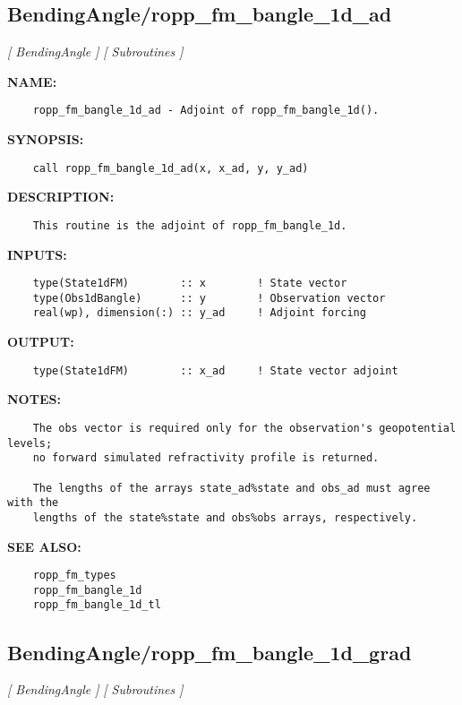 \subsection{BendingAngle/ropp\_fm\_bangle\_1d\_ad}
\textsl{[ BendingAngle ]}
\textsl{[ Subroutines ]}

\label{ch:robo4}
\label{ch:BendingAngle_ropp_fm_bangle_1d_ad}
\textbf{NAME:}\hspace{0.08in}\begin{Verbatim}
    ropp_fm_bangle_1d_ad - Adjoint of ropp_fm_bangle_1d().
\end{Verbatim}
\textbf{SYNOPSIS:}\hspace{0.08in}\begin{Verbatim}
    call ropp_fm_bangle_1d_ad(x, x_ad, y, y_ad)
\end{Verbatim}
\textbf{DESCRIPTION:}\hspace{0.08in}\begin{Verbatim}
    This routine is the adjoint of ropp_fm_bangle_1d.
\end{Verbatim}
\textbf{INPUTS:}\hspace{0.08in}\begin{Verbatim}
    type(State1dFM)        :: x        ! State vector
    type(Obs1dBangle)      :: y        ! Observation vector
    real(wp), dimension(:) :: y_ad     ! Adjoint forcing
\end{Verbatim}
\textbf{OUTPUT:}\hspace{0.08in}\begin{Verbatim}
    type(State1dFM)        :: x_ad     ! State vector adjoint
\end{Verbatim}
\textbf{NOTES:}\hspace{0.08in}\begin{Verbatim}
    The obs vector is required only for the observation's geopotential levels;
    no forward simulated refractivity profile is returned.

    The lengths of the arrays state_ad%state and obs_ad must agree with the 
    lengths of the state%state and obs%obs arrays, respectively.
\end{Verbatim}
\textbf{SEE ALSO:}\hspace{0.08in}\begin{Verbatim}
    ropp_fm_types
    ropp_fm_bangle_1d
    ropp_fm_bangle_1d_tl
\end{Verbatim}
\subsection{BendingAngle/ropp\_fm\_bangle\_1d\_grad}
\textsl{[ BendingAngle ]}
\textsl{[ Subroutines ]}

